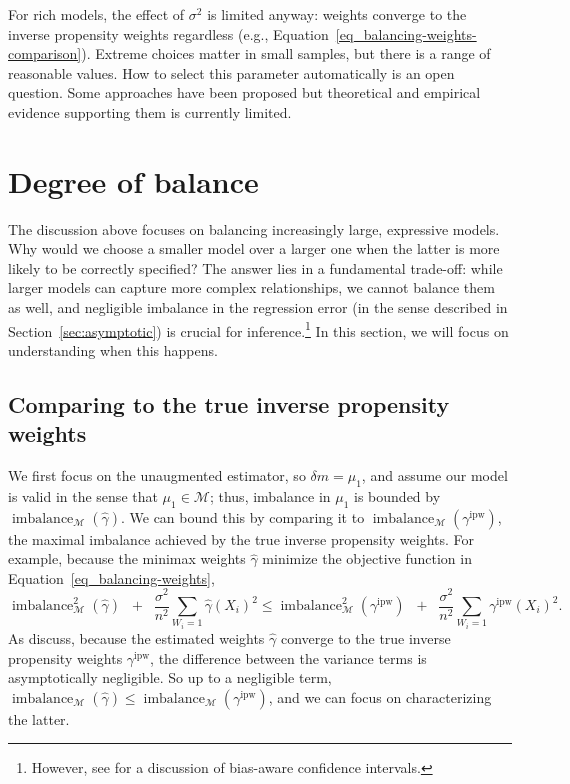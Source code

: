 \documentclass{article}
\theoremstyle{definition}
\newcommand{\ipw}{\text{ipw}}
\DeclareMathOperator{\imbalance}{imbalance}
\newcommand{\hgamma}{\ensuremath{\hat\gamma}}
\newcommand{\gammaipw}{\ensuremath{\gamma^{\ipw}}}
\newcommand{\model}{\mathcal{M}}
\newcommand{\<}{\langle}
\renewcommand{\>}{\rangle}
\begin{document}
For rich models, the effect of $\sigma^2$ is limited anyway: weights converge to the inverse propensity weights regardless (e.g., Equation~\ref{eq_balancing-weights-comparison}). Extreme choices matter in small samples, but there is a range of reasonable values. How to select this parameter automatically is an open question. Some approaches have been proposed \citep{kallus2020generalized, wang2020minimal, zhao2019covariate} but theoretical and empirical evidence supporting them is currently limited.

\section{Degree of balance}
\label{sec:trade-offs}

The discussion above focuses on balancing increasingly large, expressive models. Why would we choose a smaller model over a larger one when the latter is more likely to be correctly specified? The answer lies in a fundamental trade-off: while larger models can capture more complex relationships, we cannot balance them as well, and negligible imbalance in the regression error (in the sense described in Section~\ref{sec:asymptotic}) is crucial for inference.\footnote{However, see \citet{armstrong2018finite} for a discussion of bias-aware confidence intervals.} In this section, we will focus on understanding when this happens.

\subsection{Comparing to the true inverse propensity weights}
\label{sec:plugin}

We first focus on the unaugmented estimator, so $\delta m = \mu_1$,
and assume our model is valid in the sense that $\mu_1 \in \model$; thus,
imbalance in $\mu_1$ is bounded by $\imbalance_{\model}(\hgamma)$. We can bound this by comparing it to $\imbalance_\model(\gammaipw)$, the maximal imbalance achieved by the  true inverse propensity weights. For example, because the minimax weights $\hgamma$ minimize the objective function in Equation~\ref{eq_balancing-weights},
\begin{equation}
\label{eq_balancing-weights-comparison}
\imbalance_{\model}^2(\hgamma) \;\;+\;\; \frac{\sigma^2}{n^2} \sum_{W_i=1}\hgamma(X_i)^2 \le
\imbalance_{\model}^2(\gammaipw) \;\;+\;\; \frac{\sigma^2}{n^2} \sum_{W_i=1}\gammaipw(X_i)^2.
\end{equation}
As \citet{hirshberg2021augmented} discuss, because the estimated weights $\hgamma$ converge to the true inverse propensity weights $\gammaipw$, the difference between the variance terms is asymptotically negligible. So up to a negligible term, $\imbalance_{\model}(\hgamma) \le \imbalance_\model(\gammaipw)$, and we can focus on characterizing the latter.
\end{document}
